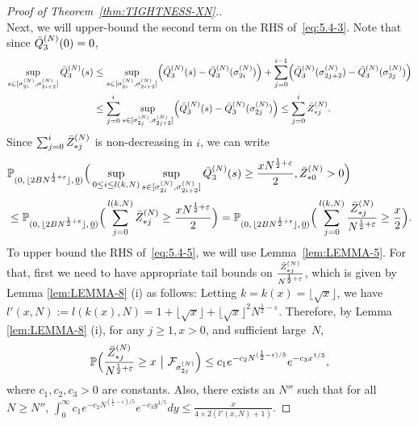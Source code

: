 \documentclass[11pt, reqno]{article}
\DeclarePairedDelimiter\autobracket{(}{)}
\newcommand{\br}[1]{\autobracket*{#1}}
\numberwithin{equation}{section}
\numberwithin{theorem}{section}
\begin{document}
\begin{proof}[Proof of Theorem~\ref{thm:TIGHTNESS-XN}.]
\begin{equation}
\end{equation}
Next, we will upper-bound the second term on the RHS of~\eqref{eq:5.4-3}.
Note that since $\Bar{Q}_3^{(N)}(0)=0$,
\begin{align*}
    \sup_{s\in [\sigma^{(N)}_{2i},\sigma^{(N)}_{2i+2}]}\Bar{Q}_3^{(N)}(s)
    &\le \sup_{s\in [\sigma^{(N)}_{2i},\sigma^{(N)}_{2i+2}]}\br{\Bar{Q}_3^{(N)}(s)-\Bar{Q}_3^{(N)}(\sigma^{(N)}_{2i})}+\sum_{j=0}^{i-1}\br{\Bar{Q}_3^{(N)}(\sigma^{(N)}_{2j+2})-\Bar{Q}_3^{(N)}(\sigma^{(N)}_{2j})}\\
    &\leq  \sum_{j=0}^{i}\sup_{s\in [\sigma^{(N)}_{2j},\sigma^{(N)}_{2j+2}]}\br{\Bar{Q}_3^{(N)}(s)-\Bar{Q}_3^{(N)}(\sigma^{(N)}_{2j})}\leq \sum_{j=0}^{i}\Bar{Z}^{(N)}_{*j}.
\end{align*}
Since  $\sum_{j=0}^{i}\Bar{Z}^{(N)}_{*j}$ is non-decreasing in $i$, we can write
\begin{align}\label{eq:5.4-5}
    &\mathbb{P}_{(0, \, \lfloor 2BN^{\frac{1}{2}+\varepsilon} \rfloor, \,\underline{0})}\Big(\sup_{0\leq i\leq l(k,N)}\sup_{s\in [\sigma^{(N)}_{2i},\sigma^{(N)}_{2i+2}]}\Bar{Q}_3^{(N)}(s)\geq \frac{xN^{\frac{1}{2}+\varepsilon}}{2},\Bar{Z}^{(N)}_{*0}>0\Big)\nonumber\\
    &\leq  \mathbb{P}_{(0, \, \lfloor 2BN^{\frac{1}{2}+\varepsilon} \rfloor, \, \underline{0})}\Big(\sum_{j=0}^{l(k,N)}\Bar{Z}^{(N)}_{*j}\geq \frac{xN^{\frac{1}{2}+\varepsilon}}{2}\Big)
    =\mathbb{P}_{(0, \, \lfloor 2BN^{\frac{1}{2}+\varepsilon} \rfloor, \, \underline{0})}\Big(\sum_{j=0}^{l(k,N)}\frac{\Bar{Z}^{(N)}_{*j}}{N^{\frac{1}{2}+\varepsilon}}\geq \frac{x}{2}\Big).
\end{align}
To upper bound the RHS of~\eqref{eq:5.4-5}, we will use Lemma~\ref{lem:LEMMA-5}.
For that, first we need to have appropriate tail bounds on $\frac{\Bar{Z}^{(N)}_{*j}}{N^{\frac{1}{2}+\varepsilon}}$, which is given by Lemma \ref{lem:LEMMA-8} (i) as follows:
Letting $k= k(x) = \lfloor \sqrt{x} \rfloor$, we have $l'(x,N) :=l(k(x),N)=1+\lfloor \sqrt{x} \rfloor +\lfloor \sqrt{x} \rfloor^2N^{\frac{1}{2}-\varepsilon}$.
Therefore, by Lemma \ref{lem:LEMMA-8} (i), for any $j\geq 1, x>0$, and sufficient large~$N$,
\begin{equation}%
    \mathbb{P}\Big(\frac{\Bar{Z}^{(N)}_{*j}}{N^{\frac{1}{2}+\varepsilon}}\geq x\ \big|\ \mathcal{F}_{\sigma^{(N)}_{2j}}\Big)\leq c_1e^{-c_2N^{(\frac{1}{2}-\varepsilon)/5}}e^{-c_3x^{1/5}},
\end{equation}
where $c_1,c_2,c_3>0$ are constants. Also, there exists an $N''$ such that for all $N\geq N''$,
$\int_0^{\infty}c_1e^{-c_2N^{(\frac{1}{2}-\varepsilon)/5}}e^{-c_3y^{1/5}}dy\leq \frac{x}{4\times 2(l'(x,N)+1)}.$

\end{proof}
\end{document}
